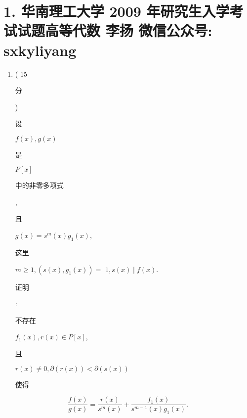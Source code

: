 \documentclass[10pt]{article}
\begin{document}
\section{1. 华南理工大学 2009 年研究生入学考试试题高等代数 
 李扬 
 微信公众号: sxkyliyang}
\begin{enumerate}
  \item ( 15 \begin{CJK}{UTF8}{mj}分\end{CJK}) \begin{CJK}{UTF8}{mj}设\end{CJK} $f(x), g(x)$ \begin{CJK}{UTF8}{mj}是\end{CJK} $P[x]$ \begin{CJK}{UTF8}{mj}中的非零多项式\end{CJK}, \begin{CJK}{UTF8}{mj}且\end{CJK} $g(x)=s^{m}(x) g_{1}(x)$, \begin{CJK}{UTF8}{mj}这里\end{CJK} $m \geq 1,\left(s(x), g_{1}(x)\right)=$ $1, s(x) \mid f(x)$. \begin{CJK}{UTF8}{mj}证明\end{CJK}: \begin{CJK}{UTF8}{mj}不存在\end{CJK} $f_{1}(x), r(x) \in P[x]$, \begin{CJK}{UTF8}{mj}且\end{CJK} $r(x) \neq 0, \partial(r(x))<\partial(s(x))$ \begin{CJK}{UTF8}{mj}使得\end{CJK}
\end{enumerate}
$$
\frac{f(x)}{g(x)}=\frac{r(x)}{s^{m}(x)}+\frac{f_{1}(x)}{s^{m-1}(x) g_{1}(x)} .
$$
\end{document}

